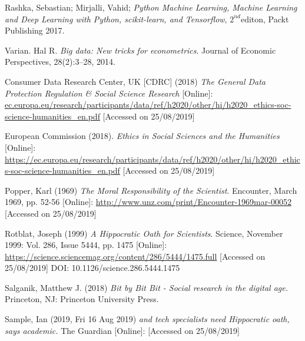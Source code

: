 \documentclass[12pt,a4paper]{article}
\begin{document}
Rashka, Sebastian; Mirjalli, Vahid; \textit{Python Machine Learning, Machine Learning and Deep Learning with Python, scikit-learn, and Tensorflow}, $2^{nd}$editon, Packt Publishing 2017. \newline

Varian. Hal R. \textit{Big data: New tricks for econometrics}. Journal of Economic Perspectives, 28(2):3–28, 2014. \newline

Consumer Data Research Center, UK  [CDRC] (2018) \textit{The General Data Protection Regulation \& Social Science Research} [Online]: \href{https://ec.europa.eu/research/participants/data/ref/h2020/other/hi/h2020_ethics-soc-science-humanities_en.pdf}{ec.europa.eu/research/participants/data/ref/h2020/other/hi/h2020\_ethics-soc-science-humanities\_en.pdf} [Accessed on 25/08/2019]\newline

European Commission (2018). \textit{Ethics in Social Sciences and the Humanities} [Online]: \href{https://ec.europa.eu/research/participants/data/ref/h2020/other/hi/h2020_ethics-soc-science-humanities_en.pdf}{https://ec.europa.eu/research/participants/data/ref/h2020/other/hi/h2020\_ethics-soc-science-humanities\_en.pdf} [Accessed on 25/08/2019] \newline

Popper, Karl (1969) \textit{The Moral Responsibility of the Scientist}. Encounter, March 1969, pp. 52-56 [Online]: \href{http://www.unz.com/print/Encounter-1969mar-00052}{http://www.unz.com/print/Encounter-1969mar-00052} [Accessed on 25/08/2019]\newline

Rotblat, Joseph (1999) \textit{A Hippocratic Oath for Scientists}. Science, November 1999: Vol. 286, Issue 5444, pp. 1475 [Online]: \href{https://science.sciencemag.org/content/286/5444/1475.full}{https://science.sciencemag.org/content/286/5444/1475.full} [Accessed on 25/08/2019] DOI: 10.1126/science.286.5444.1475 \newline
 
Salganik, Matthew J. (2018) \textit{Bit by Bit Bit - Social research in the digital age.} Princeton, NJ: Princeton University Press.\newline

Sample, Ian (2019, Fri 16 Aug 2019) \textit{and tech specialists need Hippocratic oath, says academic.} The Guardian [Online]: \href{https://www.theguardian.com/science/2019/aug/16/mathematicians-need-doctor-style-hippocratic-oath-says-academic-hannah-fry} [Accessed on 25/08/2019]\newline
\end{document}
